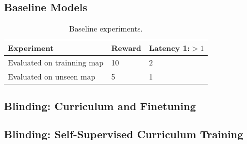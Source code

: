 %

\subsection{Baseline Models}
\begin{table}[h]
    \label{sample-table}
    \begin{center}
        \begin{tabular}{lll}
          \toprule
          Experiment & Reward & Latency 1:$>1$ \\
          \midrule
          Evaluated on trainning map & 10 & 2 \\
          Evaluated on unseen map & 5 & 1 \\
          \bottomrule
        \end{tabular}
    \end{center}
    \caption{Baseline experiments.}
\end{table}


\subsection{Blinding: Curriculum and Finetuning}

\subsection{Blinding: Self-Supervised Curriculum Training}

